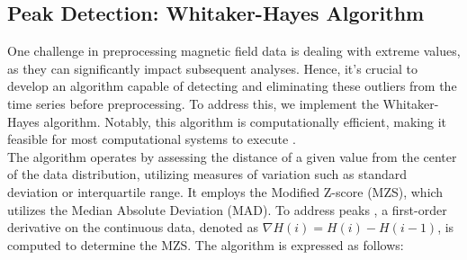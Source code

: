 \documentclass[12pt]{article}
\begin{document}
\subsection{Peak Detection: Whitaker-Hayes Algorithm}
One challenge in preprocessing magnetic field data is dealing with extreme values, as they can significantly impact subsequent analyses. Hence, it's crucial to develop an algorithm capable of detecting and eliminating these outliers from the time series before preprocessing. To address this, we implement the Whitaker-Hayes algorithm. Notably, this algorithm is computationally efficient, making it feasible for most computational systems to execute \cite{WHITAKER2018}.\\

The algorithm operates by assessing the distance of a given value from the center of the data distribution, utilizing measures of variation such as standard deviation or interquartile range. It employs the Modified Z-score (MZS), which utilizes the Median Absolute Deviation (MAD). To address peaks \citep{WHITAKER2018, removing_with_Whitaker-Hayes}, a first-order derivative on the continuous data, denoted as $\nabla H(i) = H(i)- H(i-1)$, is computed to determine the MZS. The algorithm is expressed as follows:\\
\end{document}

